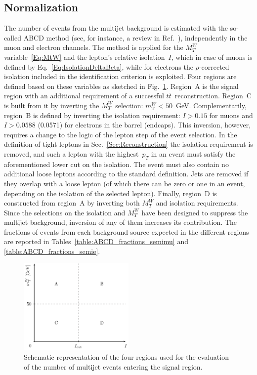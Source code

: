 \subsection{Normalization}
%
The number of events from the multijet background is estimated with the so-called ABCD method (see, for instance, a review in Ref.~\cite{Loginov:2010zz}), independently in the muon and electron channels.
The method is applied for the $M_{T}^W$ variable~\ref{Eq:MtW} and the lepton's relative isolation~$I$, which in case of muons is defined by Eq.~\ref{Eq:IsolationDeltaBeta}, while for electrons the $\rho$-corrected isolation included in the identification criterion is exploited.
Four regions are defined based on these variables as sketched in Fig.~\ref{Fig:ABCD_plane}.
Region~A is the signal region with an additional requirement of a successful $t\bar t$~reconstruction.
Region~C is built from it by inverting the $M_{T}^W$ selection: $m_\text{T}^W < 50$~GeV.
Complementarily, region~B is defined by inverting the isolation requirement: $I > 0.15$ for muons and $I > 0.0588$ (0.0571) for electrons in the barrel (endcaps).
This inversion, however, requires a change to the logic of the lepton step of the event selection.
In the definition of tight leptons in Sec.~\ref{Sec:Reconstruction} the isolation requirement is removed, and such a lepton with the highest~$p_{T}$ in an event must satisfy the aforementioned lower cut on the isolation.
The event must also contain no additional loose leptons according to the standard definition.
Jets are removed if they overlap with a loose lepton (of which there can be zero or one in an event, depending on the isolation of the selected lepton).
Finally, region~D is constructed from region~A by inverting both $M_{T}^W$ and isolation requirements.
Since the selections on the isolation and $M_{T}^W$ have been designed to suppress the multijet background, inversion of any of them increases its contribution.
The fractions of events from each background source expected in the different regions are reported in Tables~\ref{table:ABCD_fractions_semimu} and \ref{table:ABCD_fractions_semie}.

\begin{figure}
  \centering
  \includegraphics[width=0.5\textwidth]{fig/chapt6/normalisation/ABCD-sketch.pdf}
  \caption{Schematic representation of the four regions used for the evaluation of the number of multijet events entering the signal region.}
  \label{Fig:ABCD_plane}
\end{figure}

